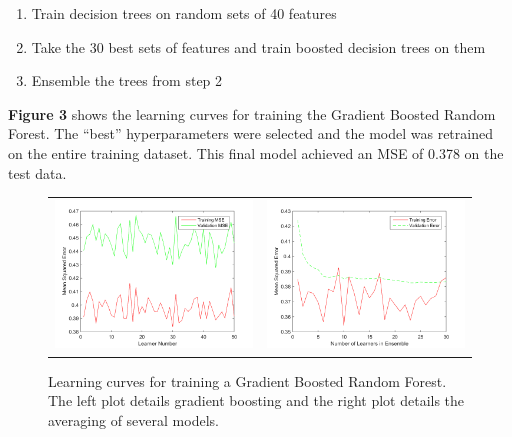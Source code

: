 \documentclass[12pt] {article}
\renewcommand{\baselinestretch}{1.3} %
\begin{document}
\begin{enumerate}
\item Train decision trees on random sets of 40 features
\item Take the 30 best sets of features and train boosted decision trees on them
\item Ensemble the trees from step 2
\end{enumerate}

\textbf{Figure 3} shows the learning curves for training the Gradient Boosted Random Forest. The ``best'' hyperparameters were selected and the model was retrained on the entire training dataset. This final model achieved an MSE of 0.378 on the test data.

\renewcommand{\baselinestretch}{1.0} %
\begin{figure}[h!] \centering
\begin{tabular}{cc}
\includegraphics[width=.45\textwidth]{figdir/learnerNumVersusMSE.png} &
\includegraphics[width=.45\textwidth]{figdir/numLearnersVersusMSE2.png} \\
\end{tabular}
\caption{Learning curves for training a Gradient Boosted Random Forest. The left plot details gradient boosting and the right plot details the averaging of several models.}
\end{figure}
\renewcommand{\baselinestretch}{1.3} %
\end{document}
